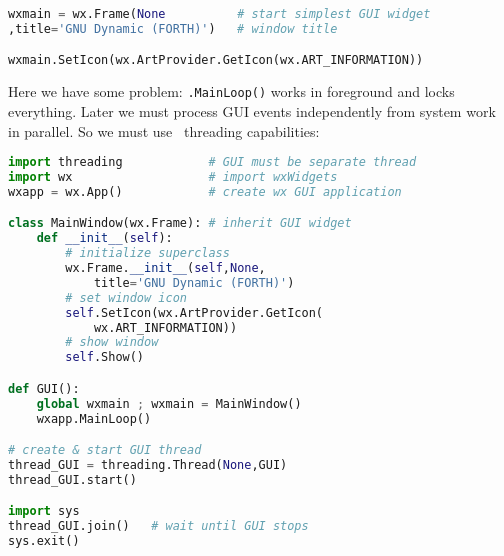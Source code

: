 \begin{lstlisting}[language=python]
wxmain = wx.Frame(None			# start simplest GUI widget
,title='GNU Dynamic (FORTH)')	# window title

wxmain.SetIcon(wx.ArtProvider.GetIcon(wx.ART_INFORMATION))
\end{lstlisting}
Here we have some problem: \verb|.MainLoop()| works in foreground and locks
everything. Later we must process GUI events independently from system work
in parallel. So we must use \py\ threading capabilities:
\begin{lstlisting}[language=python]
import threading			# GUI must be separate thread
import wx					# import wxWidgets
wxapp = wx.App()			# create wx GUI application

class MainWindow(wx.Frame):	# inherit GUI widget
	def __init__(self):
		# initialize superclass
		wx.Frame.__init__(self,None,
			title='GNU Dynamic (FORTH)')
		# set window icon
		self.SetIcon(wx.ArtProvider.GetIcon(
			wx.ART_INFORMATION))
		# show window
		self.Show()

def GUI():
	global wxmain ; wxmain = MainWindow()
	wxapp.MainLoop()

# create & start GUI thread
thread_GUI = threading.Thread(None,GUI)
thread_GUI.start()

import sys
thread_GUI.join()	# wait until GUI stops
sys.exit()
\end{lstlisting}

